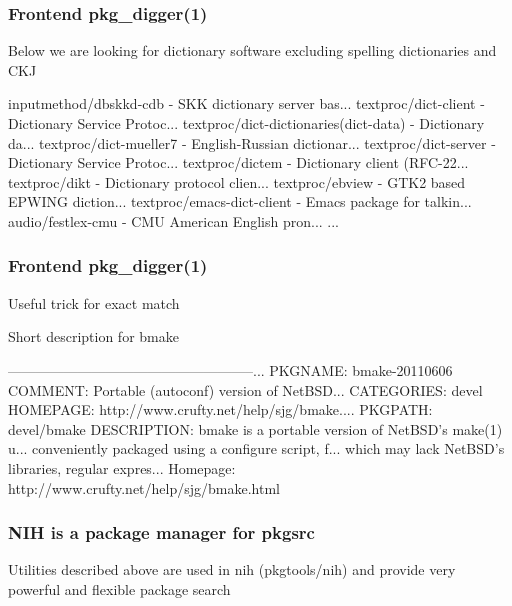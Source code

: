 \documentclass[hyperref=unicode,ascii,xcolor=dvipsnames]{beamer}
\begin{document}

\begin{frame}[fragile]
  \frametitle{Frontend pkg\_digger(1)}
{\small Below we are looking for dictionary software excluding
spelling dictionaries and CKJ}
\vspace{-0.3cm}
\begin{block}{}
    \begin{Code}{}
inputmethod/dbskkd-cdb    - SKK dictionary server bas...
textproc/dict-client      - Dictionary Service Protoc...
textproc/dict-dictionaries(dict-data) - Dictionary da...
textproc/dict-mueller7    - English-Russian dictionar...
textproc/dict-server      - Dictionary Service Protoc...
textproc/dictem           - Dictionary client (RFC-22...
textproc/dikt             - Dictionary protocol clien...
textproc/ebview           - GTK2 based EPWING diction...
textproc/emacs-dict-client - Emacs package for talkin...
audio/festlex-cmu         - CMU American English pron...
...
\prompt{#}
    \end{Code}
  \end{block}
\end{frame}


\begin{frame}[fragile]
  \frametitle{Frontend pkg\_digger(1)}
Useful trick for exact match
\begin{block}{Short description for bmake}
    \begin{Code}{}
-----------------------------------------------------...
PKGNAME:        bmake-20110606
COMMENT:        Portable (autoconf) version of NetBSD...
CATEGORIES:     devel
HOMEPAGE:       http://www.crufty.net/help/sjg/bmake....
PKGPATH:        devel/bmake
DESCRIPTION:
    bmake is a portable version of NetBSD's make(1) u...
    conveniently packaged using a configure script, f...
    which may lack NetBSD's libraries, regular expres...
    Homepage:
    http://www.crufty.net/help/sjg/bmake.html
\prompt{#}
    \end{Code}
  \end{block}
\end{frame}


\begin{frame}[fragile]
  \frametitle{NIH is a package manager for pkgsrc}
{\huge
Utilities described above are used in nih (pkgtools/nih) and provide very powerful and flexible package search}
\end{frame}
\end{document}

